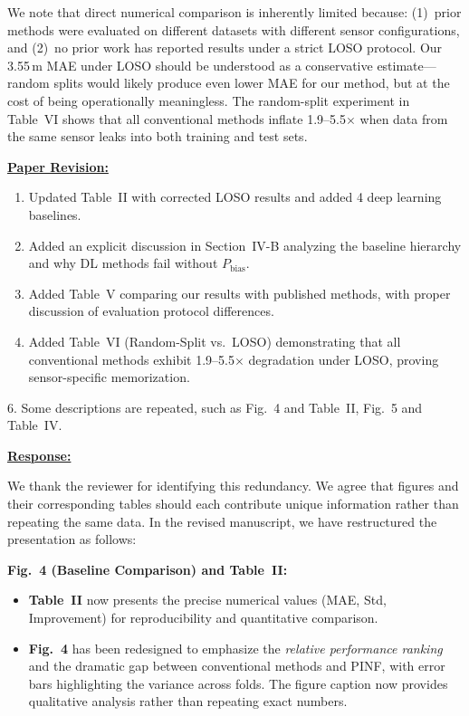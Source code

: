 We note that direct numerical comparison is inherently limited because: (1)~prior methods were evaluated on different datasets with different sensor configurations, and (2)~no prior work has reported results under a strict LOSO protocol. Our 3.55\,m MAE under LOSO should be understood as a conservative estimate---random splits would likely produce even lower MAE for our method, but at the cost of being operationally meaningless. The random-split experiment in Table~VI shows that all conventional methods inflate 1.9--5.5$\times$ when data from the same sensor leaks into both training and test sets.

\vspace{0.1cm}
\noindent
\underline{\textbf{Paper Revision:}}

\begin{enumerate}
    \item Updated Table~II with corrected LOSO results and added 4 deep learning baselines.
    \item Added an explicit discussion in Section~IV-B analyzing the baseline hierarchy and why DL methods fail without $P_{\text{bias}}$.
    \item Added Table~V comparing our results with published methods, with proper discussion of evaluation protocol differences.
    \item Added Table~VI (Random-Split vs.\ LOSO) demonstrating that all conventional methods exhibit 1.9--5.5$\times$ degradation under LOSO, proving sensor-specific memorization.
\end{enumerate}

\newpage

\begin{cmtthree}{}{}
6. Some descriptions are repeated, such as Fig.~4 and Table~II, Fig.~5 and Table~IV.

\end{cmtthree}
\vspace{0.1cm}
\noindent
\underline{\textbf{Response:}}
\vspace{0.2cm}

We thank the reviewer for identifying this redundancy. We agree that figures and their corresponding tables should each contribute unique information rather than repeating the same data. In the revised manuscript, we have restructured the presentation as follows:

\textbf{Fig.~4 (Baseline Comparison) and Table~II:}
\begin{itemize}
    \item \textbf{Table~II} now presents the precise numerical values (MAE, Std, Improvement) for reproducibility and quantitative comparison.
    \item \textbf{Fig.~4} has been redesigned to emphasize the \emph{relative performance ranking} and the dramatic gap between conventional methods and PINF, with error bars highlighting the variance across folds. The figure caption now provides qualitative analysis rather than repeating exact numbers.
\end{itemize}

